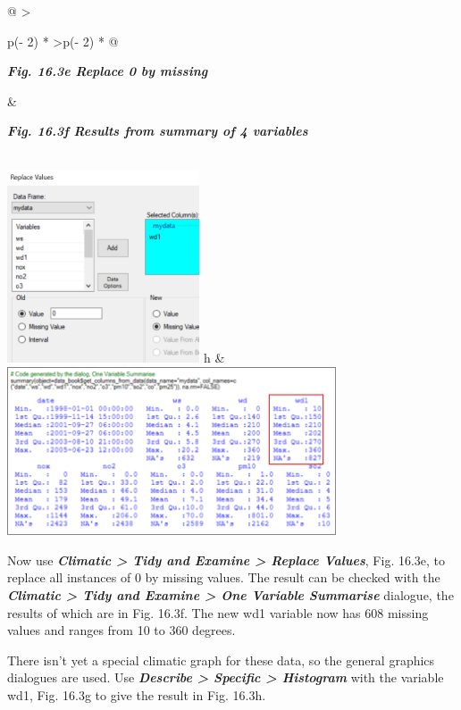 \documentclass[
  letterpaper,
  DIV=11,
  numbers=noendperiod]{scrreprt}
\begin{document}
\begin{longtable}[]{@{}
  >{\raggedright\arraybackslash}p{(\columnwidth - 2\tabcolsep) * }
  >{\raggedleft\arraybackslash}p{(\columnwidth - 2\tabcolsep) * }@{}}
\toprule\noalign{}
\begin{minipage}[b]{\linewidth}\raggedright
\textbf{\emph{Fig. 16.3e Replace 0 by missing}}
\end{minipage} & \begin{minipage}[b]{\linewidth}\raggedleft
\textbf{\emph{Fig. 16.3f Results from summary of 4 variables}}
\end{minipage} \\
\midrule\noalign{}
\endhead
\bottomrule\noalign{}
\endlastfoot
\includegraphics[width=2.24317in,height=2.24317in]{figures/Fig16.3e.png}
h &
\includegraphics[width=3.82883in,height=\textheight]{figures/Fig16.3f.png} \\
\end{longtable}

Now use \textbf{\emph{Climatic \textgreater{} Tidy and Examine
\textgreater{} Replace Values}}, Fig. 16.3e, to replace all instances of
0 by missing values. The result can be checked with the
\textbf{\emph{Climatic \textgreater{} Tidy and Examine \textgreater{}
One Variable Summarise}} dialogue, the results of which are in Fig.
16.3f. The new wd1 variable now has 608 missing values and ranges from
10 to 360 degrees.

There isn't yet a special climatic graph for these data, so the general
graphics dialogues are used. Use \textbf{\emph{Describe \textgreater{}
Specific \textgreater{} Histogram}} with the variable wd1, Fig. 16.3g to
give the result in Fig. 16.3h.
\end{document}
